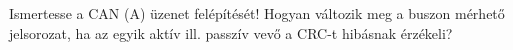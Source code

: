 \begin{example}

Ismertesse a CAN (A) üzenet felépítését! Hogyan változik meg a buszon mérhető jelsorozat, ha az egyik aktív ill. passzív vevő a CRC-t hibásnak érzékeli? 

\tcbline
\vspace{1mm}

\solution

\end{example}